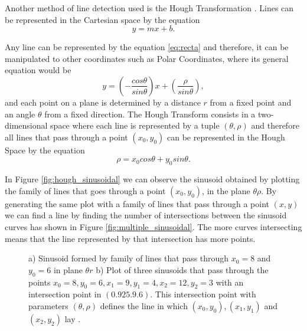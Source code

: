 Another method of line detection used is the Hough Transformation \cite{illingworth1988survey}. Lines can be represented in the Cartesian space by the equation
\begin{equation}
	y=mx+b.
	\label{eq:recta}
\end{equation}

Any line can be represented by the equation \ref{eq:recta} and therefore, it can be manipulated to other coordinates such as Polar Coordinates, where its general equation would be
\begin{equation}
	y=\left( -\frac{cos \theta}{sin \theta} \right) x + \left(\frac{\rho}{sin \theta}\right),
\end{equation}
and each point on a plane is determined by a distance $r$ from a fixed point and an angle $\theta$ from a fixed direction.
The Hough Transform consists in a two-dimensional space where each line is represented by a tuple $(\theta,\rho)$ and therefore all lines that pass through a point $(x_{0}, y_{0})$ can be represented in the Hough Space by the equation
\begin{equation}
\rho = x_{0}cos\theta + y_{0}sin\theta.
\label{eq:hough_eq}
\end{equation}

In Figure \ref{fig:hough_sinusoidal} we can observe the sinusoid obtained by plotting the family of lines that goes through a point $(x_{0}, y_{0})$, in the plane $\theta \rho$. By generating the same plot with a family of lines that pass through a point $(x, y)$ we can find a line by finding the number of intersections between the sinusoid curves has shown in Figure \ref{fig:multiple_sinusoidal}. The more curves intersecting means that the line represented by that intersection has more points\cite{OCV}.
\begin{figure}[htbp]
	\centering
  \caption{a) Sinusoid formed by family of lines that pass through $x_{0} =8$ and $y_{0} = 6$ in plane $\theta r$ b) Plot of three sinusoids that pass through the points $x_{0} = 8,y_{0} = 6, x_{1} = 9,y_{1} = 4, x_{2} = 12, y_{2} = 3$ with an intersection point in $(0.925.9.6)$. This intersection point with parameters $(\theta,\rho)$ defines the line in which $(x_{0},y_{0}), (x_{1},y_{1})$ and $(x_{2},y_{2})$ lay \cite{OCV}.}
\end{figure}

